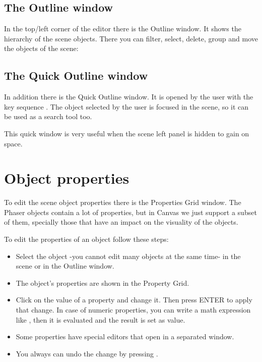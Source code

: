 \documentclass[letterpaper,10pt,english]{sphinxmanual}
\begin{document}
\subsection{The Outline window}
\label{\detokenize{canvas:the-outline-window}}
In the top/left corner of the editor there is the Outline window. It shows the hierarchy of the scene objects. There you can filter, select, delete, group and move the objects of the scene:

\noindent{}


\subsection{The Quick Outline window}
\label{\detokenize{canvas:the-quick-outline-window}}
In addition there is the Quick Outline window. It is opened by the user with the key sequence . The object selected by the user is focused in the scene, so it can be used as a search tool too.

This quick window is very useful when the scene left panel is hidden to gain on space.

\noindent{}


\section{Object properties}
\label{\detokenize{canvas:object-properties}}
To edit the scene object properties there is the Properties Grid window. The Phaser objects contain a lot of properties, but in Canvas we just support a subset of them, specially those that have an impact on the visuality of the objects.

To edit the properties of an object follow these steps:
\begin{itemize}
\item {} 
Select the object -you cannot edit many objects at the same time- in the scene or in the Outline window.

\item {} 
The object’s properties are shown in the Property Grid.

\item {} 
Click on the value of a property and change it. Then press ENTER to apply that change. In case of numeric properties, you can write a math expression like , then it is evaluated and the result is set as value.

\item {} 
Some properties have special editors that open in a separated window.

\item {} 
You always can undo the change by pressing .

\end{itemize}
\end{document}
